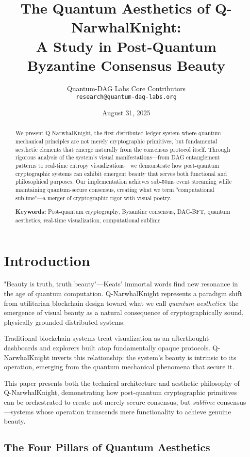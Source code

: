 \documentclass[12pt,a4paper]{article}
\title{\textbf{The Quantum Aesthetics of Q-NarwhalKnight:\\
A Study in Post-Quantum Byzantine Consensus Beauty}}
\author{
Quantum-DAG Labs Core Contributors\\
\texttt{research@quantum-dag-labs.org}
}
\date{August 31, 2025}
\begin{document}
\maketitle

\begin{abstract}
We present Q-NarwhalKnight, the first distributed ledger system where quantum mechanical principles are not merely cryptographic primitives, but fundamental aesthetic elements that emerge naturally from the consensus protocol itself. Through rigorous analysis of the system's visual manifestations—from DAG entanglement patterns to real-time entropy visualizations—we demonstrate how post-quantum cryptographic systems can exhibit emergent beauty that serves both functional and philosophical purposes. Our implementation achieves sub-50ms event streaming while maintaining quantum-secure consensus, creating what we term "computational sublime"—a merger of cryptographic rigor with visual poetry.

\textbf{Keywords:} Post-quantum cryptography, Byzantine consensus, DAG-BFT, quantum aesthetics, real-time visualization, computational sublime
\end{abstract}

\section{Introduction}

"Beauty is truth, truth beauty"—Keats' immortal words find new resonance in the age of quantum computation. Q-NarwhalKnight represents a paradigm shift from utilitarian blockchain design toward what we call \textit{quantum aesthetics}: the emergence of visual beauty as a natural consequence of cryptographically sound, physically grounded distributed systems.

Traditional blockchain systems treat visualization as an afterthought—dashboards and explorers built atop fundamentally opaque protocols. Q-NarwhalKnight inverts this relationship: the system's beauty is intrinsic to its operation, emerging from the quantum mechanical phenomena that secure it.

This paper presents both the technical architecture and aesthetic philosophy of Q-NarwhalKnight, demonstrating how post-quantum cryptographic primitives can be orchestrated to create not merely secure consensus, but \textit{sublime} consensus—systems whose operation transcends mere functionality to achieve genuine beauty.

\subsection{The Four Pillars of Quantum Aesthetics}
\end{document}
